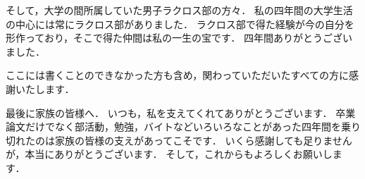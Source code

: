 そして，大学の間所属していた男子ラクロス部の方々．
私の四年間の大学生活の中心には常にラクロス部がありました．
ラクロス部で得た経験が今の自分を形作っており，そこで得た仲間は私の一生の宝です．
四年間ありがとうございました．

ここには書くことのできなかった方も含め，関わっていただいたすべての方に感謝いたします．

\vspace{\baselineskip}
最後に家族の皆様へ．
いつも，私を支えてくれてありがとうございます．
卒業論文だけでなく部活動，勉強，バイトなどいろいろなことがあった四年間を乗り切れたのは家族の皆様の支えがあってこそです．
いくら感謝しても足りませんが，本当にありがとうございます．
そして，これからもよろしくお願いします．
